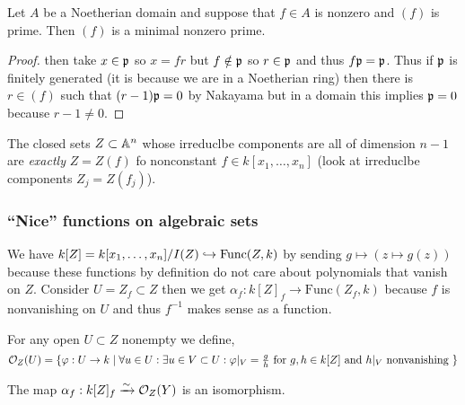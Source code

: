 \documentclass[12pt]{article}
\begin{document}
\begin{prop}
Let $A$ be a Noetherian domain and suppose that $f \in A$ is nonzero and $(f)$ is prime. Then $(f)$ is a minimal nonzero prime.
\end{prop}

\begin{proof}
 then take $x \in \mathfrak{p}$ so $x = fr$ but $f \notin \mathfrak{p}$ so $r \in \mathfrak{p}$ and thus $f \mathfrak{p} = \mathfrak{p}$. Thus if $\mathfrak{p}$ is finitely generated (it is because we are in a Noetherian ring) then there is $r \in (f)$ such that $(r - 1) \mathfrak{p} = 0$ by Nakayama but in a domain this implies $\mathfrak{p} = 0$ because $r - 1 \neq 0$.
\end{proof}

\begin{rmk}
The closed sets $Z \subset \mathbb{A}^n$ whose irreduclbe components are all of dimension $n - 1$ are \textit{exactly} $Z = Z(f)$ fo nonconstant $f \in k[x_1, \dots, x_n]$ (look at irreduclbe components $Z_j = Z(f_j)$).
\end{rmk}

\subsubsection{``Nice'' functions on algebraic sets}

We have $k[Z] = k[x_1, \dots, x_n] / I(Z) \hookrightarrow \mathrm{Func}(Z, k)$ by sending $g \mapsto (z \mapsto g(z))$ because these functions by definition do not care about polynomials that vanish on $Z$. Consider $U = Z_f \subset Z$ then we get $\alpha_f : k[Z]_f \to \mathrm{Func}(Z_f, k)$ because $f$ is nonvanishing on $U$ and thus $f^{-1}$ makes sense as a function. 

\begin{defn}
For any open $U \subset Z$ nonempty we define,
\[ \mathcal{O}_{Z}(U) = \{ \varphi : U \to k \mid \forall u \in U : \exists u \in V \subset U : \varphi|_V = \tfrac{g}{h} \text{ for } g,h \in k[Z] \text{ and } h|_V \text{ nonvanishing } \} \]
\end{defn}

\begin{prop}
The map $\alpha_f : k[Z]_f \xrightarrow{\sim} \mathcal{O}_{Z}(Y)$ is an isomorphism.
\end{prop}
\end{document}
